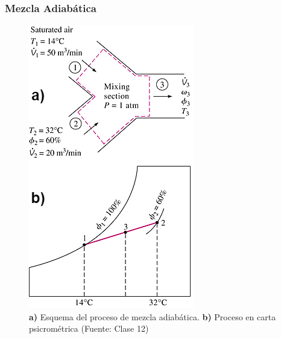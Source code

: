         \subsubsection{Mezcla Adiabática}
        
        \begin{multicols}{2}
        
            \begin{figure}
                \includegraphics[width=\textwidth]{img/clases/mezcla_adiab_psicrometria_edit.png}
                \caption[Mezcla Adiabática]{\textbf{a)} Esquema del proceso de mezcla adiabática. \textbf{b)} Proceso en carta psicrométrica (Fuente: Clase 12)}
                \label{fig:mezcla_adiab_psicrometria}
            \end{figure}
            

\end{multicols}
